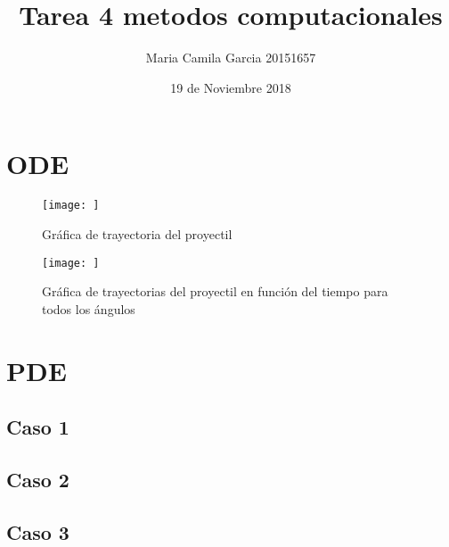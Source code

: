 \documentclass{article}
\title{Tarea 4 metodos computacionales}
\author{Maria Camila Garcia 20151657 }
\date{19 de Noviembre 2018}
\begin{document}
\maketitle
\section{ODE}

\begin{figure}[h!]
    \centering
    \texttt{[image: ]}
    \caption{Gráfica de trayectoria del proyectil}

\end{figure}

\begin{figure}[h!]
    \centering
    \texttt{[image: ]}
    \caption{Gráfica de trayectorias del proyectil en función del tiempo para todos los ángulos}
\end{figure}


\section{PDE}
\subsection{Caso 1}

\subsection{Caso 2}

\subsection{Caso 3}
\end{document}

